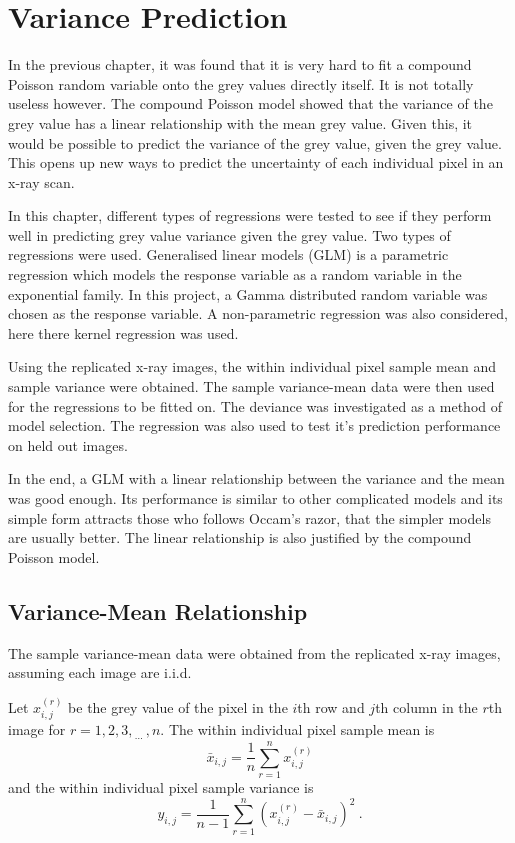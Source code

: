 \documentclass[12pt, a4paper]{memoir}
\newcommand{\dotdotdot}{_{\phantom{.}\cdots}}
\begin{document}
\chapter{Variance Prediction}

In the previous chapter, it was found that it is very hard to fit a compound Poisson random variable onto the grey values directly itself. It is not totally useless however. The compound Poisson model showed that the variance of the grey value has a linear relationship with the mean grey value. Given this, it would be possible to predict the variance of the grey value, given the grey value. This opens up new ways to predict the uncertainty of each individual pixel in an x-ray scan.

In this chapter, different types of regressions were tested to see if they perform well in predicting grey value variance given the grey value. Two types of regressions were used. Generalised linear models \citep{nelder1972generalized} \citep{nelder1972generalized_2} \citep{mccullagh1984generalized} (GLM) is a parametric regression which models the response variable as a random variable in the exponential family. In this project, a Gamma distributed random variable was chosen as the response variable. A non-parametric regression was also considered, here there kernel regression \citep{friedman2001elements} was used.

Using the replicated x-ray images, the within individual pixel sample mean and sample variance were obtained. The sample variance-mean data were then used for the regressions to be fitted on. The deviance was investigated as a method of model selection. The regression was also used to test it's prediction performance on held out images.

In the end, a GLM with a linear relationship between the variance and the mean was good enough. Its performance is similar to other complicated models and its simple form attracts those who follows Occam's razor, that the simpler models are usually better. The linear relationship is also justified by the compound Poisson model.

\section{Variance-Mean Relationship}

The sample variance-mean data were obtained from the replicated x-ray images, assuming each image are i.i.d.

Let $x_{i,j}^{(r)}$ be the grey value of the pixel in the $i$th row and $j$th column in the $r$th image for $r=1,2,3,\dotdotdot,n$. The within individual pixel sample mean is
\begin{equation}
    \bar{x}_{i,j}=\frac{1}{n}\sum_{r=1}^n x_{i,j}^{(r)}
\end{equation}
and the within individual pixel sample variance is
\begin{equation}
    y_{i,j} =
    \frac{1}{n-1}
    \sum_{r=1}^n
        \left(
            x_{i,j}^{(r)} - \bar{x}_{i,j}
        \right)^2
    \ .
\end{equation}
\end{document}
